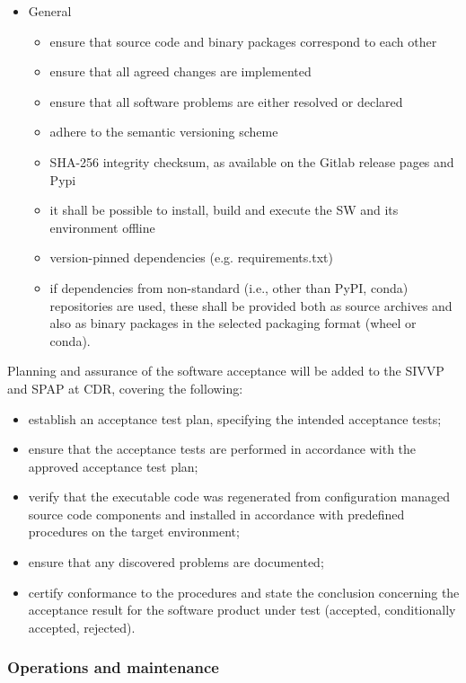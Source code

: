\begin{itemize}
    \item General
        \begin{itemize}
            \item ensure that source code and binary packages correspond to each other
            \item ensure that all agreed changes are implemented
            \item ensure that all software problems are either resolved or declared
            \item adhere to the semantic versioning scheme
            \item SHA-256 integrity checksum, as available on the Gitlab release pages and Pypi
            \item it shall be possible to install, build and execute the SW and its environment offline
            \item version-pinned dependencies (e.g. requirements.txt)
            \item if dependencies from non-standard (i.e., other than PyPI, conda) repositories are used, these shall be provided both as source archives and also as binary packages in the selected packaging format (wheel or conda). 
        \end{itemize}
\end{itemize}

Planning and assurance of the software acceptance will be added to the SIVVP and SPAP at CDR, covering the following:
\begin{itemize}
    \item establish an acceptance test plan, specifying the intended acceptance tests;
    \item ensure that the acceptance tests are performed in accordance with the approved acceptance test plan;
    \item verify that the executable code was regenerated from configuration managed source code components and installed in accordance with predefined procedures on the target environment;
    \item ensure that any discovered problems are documented;
    \item certify conformance to the procedures and state the conclusion concerning the acceptance result for the software product under test (accepted, conditionally accepted, rejected).
\end{itemize}

\subsubsection{Operations and maintenance}

